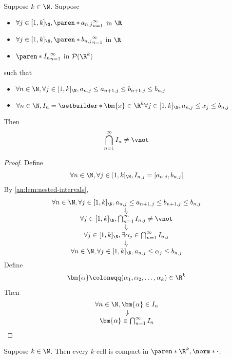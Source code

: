 \begin{theorem} \label{an:thm:nested-k-cells}
  Suppose $k \in \N$. Suppose
  \begin{itemize}
    \item $\forall j \in [1, k]_{\N}, \paren*{a_{n, j}}_{n = 1}^{\infty}$ in $\R$
    \item $\forall j \in [1, k]_{\N}, \paren*{b_{n, j}}_{n = 1}^{\infty}$ in $\R$
    \item $\paren*{I_{n}}_{n = 1}^{\infty}$ in $\mathcal{P}(\R^{k})$
  \end{itemize}
  such that
  \begin{itemize}
    \item $\forall n \in \N, \forall j \in [1, k]_{\N}, a_{n, j} \leq a_{n + 1, j} \leq b_{n + 1, j} \leq b_{n, j}$
    \item $\forall n \in \N, I_{n} = \setbuilder*{\bm{x} \in \R^{k}}{\forall j \in [1, k]_{\N}, a_{n, j} \leq x_{j} \leq b_{n, j}}$
  \end{itemize}
  Then
  \[
    \bigcap_{n = 1}^{\infty} I_{n} \neq \vnot
  \]
\end{theorem}

\begin{proof}
  Define
  \[
    \forall n \in \N, \forall j \in [1, k]_{\N}, I_{n, j} = [a_{n, j}, b_{n, j}]
  \]
  By \cref{an:lem:nested-intervals},
  \[
    \begin{array}{c}
      \forall n \in \N, \forall j \in [1, k]_{\N}, a_{n, j} \leq a_{n + 1, j} \leq b_{n + 1, j} \leq b_{n, j} \\
      \Downarrow                                                                                              \\
      \forall j \in [1, k]_{\N}, \bigcap_{n = 1}^{\infty} I_{n, j} \neq \vnot                                 \\
      \Downarrow                                                                                              \\
      \forall j \in [1, k]_{\N}, \exists \alpha_{j} \in \bigcap_{n = 1}^{\infty} I_{n, j}                     \\
      \Downarrow                                                                                              \\
      \forall n \in \N, \forall j \in [1, k]_{\N}, a_{n, j} \leq \alpha_{j} \leq b_{n, j}
    \end{array}
  \]
  Define
  \[
    \bm{\alpha} \coloneqq (\alpha_{1}, \alpha_{2}, \dots, \alpha_{k}) \in \R^{k}
  \]
  Then
  \[
    \begin{array}{c}
      \forall n \in \N, \bm{\alpha} \in I_{n} \\
      \Downarrow                              \\
      \bm{\alpha} \in \bigcap_{n = 1}^{\infty} I_{n}
    \end{array}
  \]
\end{proof}

\bigskip

\begin{theorem} \label{an:thm:k-cell-is-compact}
  Suppose $k \in \N$. Then every $k$-cell is compact in $\paren*{\R^{k}, \norm*{\cdot}}$.
\end{theorem}
